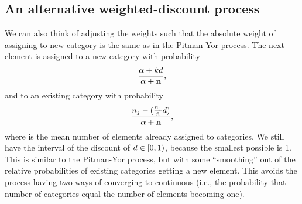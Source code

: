 \subsection{An alternative weighted-discount process}

We can also think of adjusting the weights such that the absolute weight of
assigning to new category is the same as in the Pitman-Yor process.
The next element is assigned to
a new category with probability
\begin{equation}
    \frac{\concentration + \numcats\discount}{\concentration + \numassignedtotal},
    \label{eq:pywdprobnew}
\end{equation}
and to an existing category with probability
\begin{equation}
    \frac{\numassigned[\catindex] - (\frac{\numassigned[\catindex]}{\numassignedmean}\discount)}{\concentration + \numassignedtotal},
    \label{eq:pywdprobexisting}
\end{equation}
where \numassignedmean is the mean number of elements already assigned to
categories.  We still have the interval of the discount of $d \in [0,
1)$, because the smallest possible \numassignedmean is 1.
This is similar to the Pitman-Yor process, but with some ``smoothing'' out of
the relative probabilities of existing categories getting a new element.
This avoids the process having two ways of converging to continuous
(i.e., the probability that number of categories equal the number of
elements becoming one).

